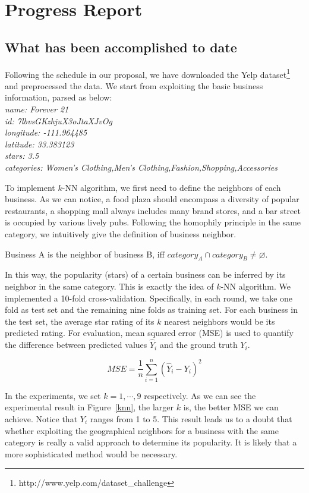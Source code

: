 \section*{Progress Report}
\subsection{What has been accomplished to date}

Following the schedule in our proposal, we have downloaded the Yelp dataset\footnote{http://www.yelp.com/dataset\_challenge} and preprocessed the data. We start from exploiting the basic business information, parsed as below:\\
\emph{
\small
\indent name: Forever 21\\
\indent id: 7lbvsGKzhjuX3oJtaXJvOg\\
\indent longitude: -111.964485\\
\indent latitude: 33.383123\\
\indent stars: 3.5\\
\indent categories: Women's Clothing,Men's Clothing,Fashion,Shopping,Accessories
}

To implement $k$-NN algorithm, we first need to define the neighbors of each business. As we can notice, a food plaza should encompass a diversity of popular restaurants, a shopping mall always includes many brand stores, and a bar street is occupied by various lively pubs. Following the homophily principle in the same category, we intuitively give the definition of business neighbor.

\begin{defn}
Business A is the neighbor of business B, iff $category_A \cap category_B \neq \varnothing$.
\end{defn}

In this way, the popularity (stars) of a certain business can be inferred by its neighbor in the same category. This is exactly the idea of $k$-NN algorithm. We implemented a 10-fold cross-validation. Specifically, in each round, we take one fold as test set and the remaining nine folds as training set. For each business in the test set, the average star rating of its $k$ nearest neighbors would be its predicted rating. For evaluation, mean squared error (MSE) is used to quantify the difference between predicted values $\hat{Y}_i$ and the ground truth $Y_i$.

$$MSE=\frac{1}{n}\sum_{i=1}^{n}(\hat{Y}_i-Y_i)^2$$

In the experiments, we set $k=1,\cdots,9$ respectively. As we can see the experimental result in Figure~\ref{knn}, the larger $k$ is, the better MSE we can achieve. Notice that $Y_i$ ranges from 1 to 5. This result leads us to a doubt that whether exploiting the geographical neighbors for a business with the same category is really a valid approach to determine its popularity. It is likely that a more sophisticated method would be necessary.

